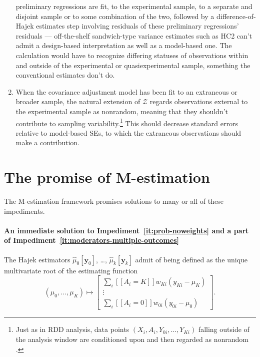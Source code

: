 \begin{enumerate}
  preliminary regressions are fit, to the experimental sample, to a
  separate and disjoint sample or to some combination of the two,
  followed by a difference-of-Hajek estimates step involving residuals
  of these preliminary regressions' residuals --- off-the-shelf 
  sandwich-type variance estimates such as HC2 can't admit a design-based interpretation as well as
  a  model-based one. The calculation would have to recognize differing statuses of observations within and outside of the experimental or quasiexperimental sample, something the conventional estimates don't do. 
\item \label{it:prob-nonexperimentals-as-nonrandom}
  When the covariance adjustment model has been fit to an extraneous or
  broader sample, the natural extension of \(\mathcal{Z}\) regards
  observations external to the experimental sample as nonrandom, meaning
  that they shouldn't contribute to sampling variability.\footnote{Just as in
  RDD analysis, data points $(X_{i}, A_{i}, Y_{0i}, \ldots, Y_{Ki})$
  falling outside of the analysis window are
  conditioned upon and then regarded as nonrandom \citep[][display A1 on p.22]{salesHansen2019lrd}.} This should decrease standard
  errors relative to model-based SEs, to which the extraneous observations should make a 
contribution. 
\end{enumerate}

\section*{The promise of M-estimation}
The M-estimation framework promises solutions to many or all of
these impediments.  
\paragraph*{An immediate solution to
  Impediment~\ref{it:prob-noweights} and a part of Impediment~\ref{it:moderators-multiple-outcomes}}

The Hajek estimators $\hat{\mu}_{0}[\mathbf{y}_{0}]$, \ldots,
$\hat{\mu}_{k}[\mathbf{y}_{k}]$ admit of being defined as the unique
multivariate root of the estimating function
\begin{equation} \label{eq:ee-hajekdiff}
(\mu_{0}, \ldots, \mu_{K}) \mapsto
  \left[
\begin{array}{c}
\sum_i [\![A_i=K]\!] w_{Ki} (y_{Ki} - \mu_K) \\
\vdots \\
\sum_i [\![A_i=0]\!] w_{0i} (y_{0i} - \mu_0) 
\end{array}
\right]
.
\end{equation}

